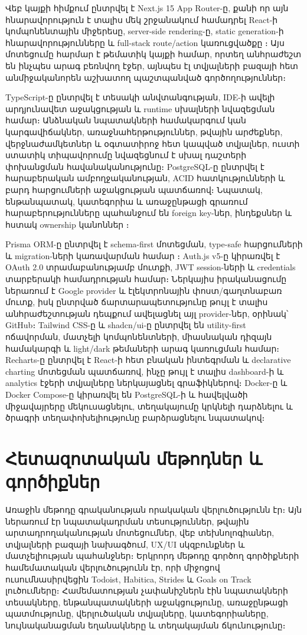 Վեբ կայքի հիմքում ընտրվել է Next.js 15 App Router-ը, քանի որ այն հնարավորություն է տալիս մեկ շրջանակում համադրել React-ի կոմպոնենտային միջերեսը, server-side rendering-ը, static generation-ի հնարավորությունները և full-stack route/action կառուցվածքը \autocite{nextDocsRendering,nextDocsAppGlossary}։ Այս մոտեցումը հարմար է թեմատիկ կայքի համար, որտեղ անհրաժեշտ են ինչպես արագ բեռնվող էջեր, այնպես էլ տվյալների բազայի հետ անմիջականորեն աշխատող պաշտպանված գործողություններ։

TypeScript-ը ընտրվել է տեսակի անվտանգության, IDE-ի ավելի արդյունավետ աջակցության և runtime սխալների նվազեցման համար։ Անձնական նպատակների համակարգում կան կարգավիճակներ, առաջնահերթություններ, թվային արժեքներ, վերջնաժամկետներ և օգտատիրոջ հետ կապված տվյալներ, ուստի ստատիկ տիպավորումը նվազեցնում է սխալ դաշտերի փոխանցման հավանականությունը։ PostgreSQL-ը ընտրվել է հարաբերական ամբողջականության, ACID հատկությունների և բարդ հարցումների աջակցության պատճառով։ Նպատակ, ենթանպատակ, կատեգորիա և առաջընթացի գրառում հարաբերությունները պահանջում են foreign key-ներ, ինդեքսներ և հստակ ownership կանոններ \autocite{postgresDocsConstraints,postgresDocsIndexes}։

Prisma ORM-ը ընտրվել է schema-first մոտեցման, type-safe հարցումների և migration-ների կառավարման համար \autocite{prismaDocsSchema,prismaDocsRelations}։ Auth.js v5-ը կիրառվել է OAuth 2.0 տրամաբանությամբ մուտքի, JWT session-ների և credentials տարբերակի համադրության համար։ Ներկայիս իրականացումը ներառում է Google provider և էլեկտրոնային փոստ/գաղտնաբառ մուտք, իսկ ընտրված ճարտարապետությունը թույլ է տալիս անհրաժեշտության դեպքում ավելացնել այլ provider-ներ, օրինակ՝ GitHub։ Tailwind CSS-ը և shadcn/ui-ը ընտրվել են utility-first ոճավորման, մատչելի կոմպոնենտների, միասնական դիզայն համակարգի և light/dark թեմաների արագ կառուցման համար։ Recharts-ը ընտրվել է React-ի հետ բնական ինտեգրման և declarative charting մոտեցման պատճառով, ինչը թույլ է տալիս dashboard-ի և analytics էջերի տվյալները ներկայացնել գրաֆիկներով։ Docker-ը և Docker Compose-ը կիրառվել են PostgreSQL-ի և հավելվածի միջավայրերը մեկուսացնելու, տեղակայումը կրկնելի դարձնելու և ծրագրի տեղափոխելիությունը բարձրացնելու նպատակով։

\section{Հետազոտական մեթոդներ և գործիքներ}

Առաջին մեթոդը գրականության որակական վերլուծությունն էր։ Այն ներառում էր նպատակադրման տեսություններ, թվային արտադրողականության մոտեցումներ, վեբ տեխնոլոգիաներ, տվյալների բազայի նախագծում, UX/UI սկզբունքներ և մատչելիության պահանջներ։ Երկրորդ մեթոդը գործող գործիքների համեմատական վերլուծությունն էր, որի միջոցով ուսումնասիրվեցին Todoist, Habitica, Strides և Goals on Track լուծումները։ Համեմատության չափանիշներն էին նպատակների տեսակները, ենթանպատակների աջակցությունը, առաջընթացի պատմությունը, վերլուծական տվյալները, կատեգորիաները, նույնականացման եղանակները և տեղակայման ճկունությունը։

